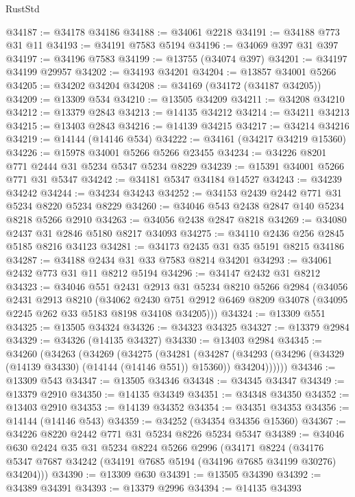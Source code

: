 \begin{lexlean}{RustStd}
\begin{coremodule}
@34187 := @34178 @34186
@34188 := @34061 @2218
@34191 := @34188 @773 @31 @11
@34193 := @34191 @7583 @5194
@34196 := @34069 @397 @31 @397
@34197 := @34196 @7583
@34199 := @13755 (@34074 @397)
@34201 := @34197 @34199 @29957
@34202 := @34193 @34201
@34204 := @13857 @34001 @5266
@34205 := @34202 @34204
@34208 := @34169 (@34172 (@34187 @34205))
@34209 := @13309 @534
@34210 := @13505 @34209
@34211 := @34208 @34210
@34212 := @13379 @2843
@34213 := @14135 @34212
@34214 := @34211 @34213
@34215 := @13403 @2843
@34216 := @14139 @34215
@34217 := @34214 @34216
@34219 := @14144 (@14146 @534)
@34222 := @34161 (@34217 @34219 @15360)
@34226 := @15978 @34001 @5266 @5266 @23455
@34234 := @34226 @8201 @771 @2444 @31 @5234 @5347 @5234 @8229
@34239 := @15391 @34001 @5266 @771 @31 @5347
@34242 := @34181 @5347 @34184 @14527
@34243 := @34239 @34242
@34244 := @34234 @34243
@34252 := @34153 @2439 @2442 @771 @31 @5234 @8220 @5234 @8229
@34260 := @34046 @543 @2438 @2847 @140 @5234 @8218 @5266 @2910
@34263 := @34056 @2438 @2847 @8218
@34269 := @34080 @2437 @31 @2846 @5180 @8217 @34093
@34275 := @34110 @2436 @256 @2845 @5185 @8216 @34123
@34281 := @34173 @2435 @31 @35 @5191 @8215 @34186
@34287 := @34188 @2434 @31 @33 @7583 @8214 @34201
@34293 := @34061 @2432 @773 @31 @11 @8212 @5194
@34296 := @34147 @2432 @31 @8212
@34323 := @34046
    @551
    @2431
    @2913
    @31
    @5234
    @8210
    @5266
    @2984
    (@34056
      @2431
      @2913
      @8210
      (@34062
        @2430
        @751
        @2912
        @6469
        @8209
        @34078
        (@34095 @2245 @262 @33 @5183 @8198 @34108 @34205)))
@34324 := @13309 @551
@34325 := @13505 @34324
@34326 := @34323 @34325
@34327 := @13379 @2984
@34329 := @34326 (@14135 @34327)
@34330 := @13403 @2984
@34345 := @34260
    (@34263
      (@34269
        (@34275
          (@34281
            (@34287
              (@34293 (@34296 (@34329 (@14139 @34330) (@14144 (@14146 @551)) @15360)) @34204))))))
@34346 := @13309 @543
@34347 := @13505 @34346
@34348 := @34345 @34347
@34349 := @13379 @2910
@34350 := @14135 @34349
@34351 := @34348 @34350
@34352 := @13403 @2910
@34353 := @14139 @34352
@34354 := @34351 @34353
@34356 := @14144 (@14146 @543)
@34359 := @34252 (@34354 @34356 @15360)
@34367 := @34226 @8220 @2442 @771 @31 @5234 @8226 @5234 @5347
@34389 := @34046
    @630
    @2424
    @35
    @31
    @5234
    @8224
    @5266
    @2996
    (@34171
      @8224
      (@34176 @5347 @7687 @34242 (@34191 @7685 @5194 (@34196 @7685 @34199 @30276) @34204)))
@34390 := @13309 @630
@34391 := @13505 @34390
@34392 := @34389 @34391
@34393 := @13379 @2996
@34394 := @14135 @34393

\end{coremodule}
\end{lexlean}
